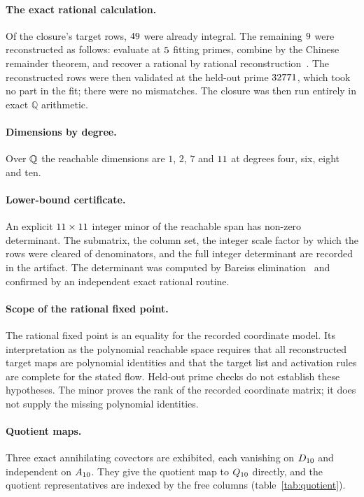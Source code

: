 \paragraph{The exact rational calculation.}
Of the closure's target rows, $49$ were already integral. The
remaining $9$ were reconstructed as follows: evaluate at
$5$ fitting primes, combine by the Chinese remainder theorem, and
recover a rational by rational reconstruction~\cite{Wang:1982}. The reconstructed
rows were then validated at the held-out prime $32771$, which took no
part in the fit; there were no mismatches. The closure was then run entirely in
exact $\mathbb{Q}$ arithmetic.

\paragraph{Dimensions by degree.}
Over $\mathbb{Q}$ the reachable dimensions are $1$, $2$, $7$ and $11$ at degrees
four, six, eight and ten.

\paragraph{Lower-bound certificate.}
An explicit $11 \times 11$ integer minor of the reachable
span has non-zero determinant. The submatrix, the column set, the integer scale
factor by which the rows were cleared of denominators, and the full integer
determinant are recorded in the artifact. The determinant was computed by Bareiss
elimination~\cite{Bareiss:1968} and confirmed by an independent exact rational
routine.

\paragraph{Scope of the rational fixed point.}
The rational fixed point is an equality for the recorded coordinate model.
Its interpretation as the polynomial reachable space requires that all
reconstructed target maps are polynomial identities and that the target list
and activation rules are complete for the stated flow. Held-out prime checks
do not establish these hypotheses. The minor proves the rank of the recorded
coordinate matrix; it does not supply the missing polynomial identities.

\paragraph{Quotient maps.}
Three exact annihilating covectors are exhibited, each vanishing on $D_{10}$ and
independent on $A_{10}$. They give the quotient map to $Q_{10}$ directly, and the
quotient representatives are indexed by the free columns
(table~\ref{tab:quotient}).
